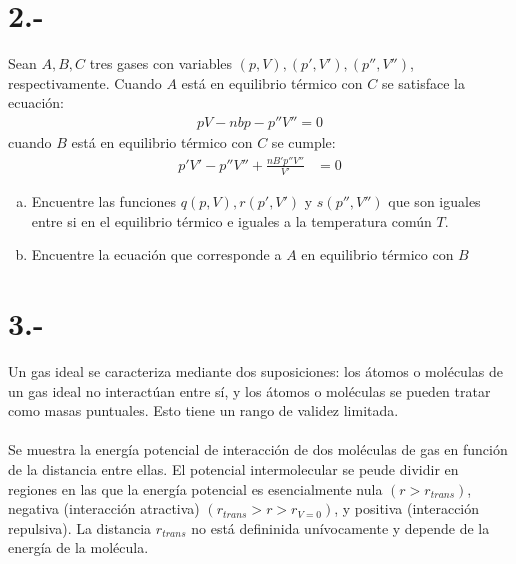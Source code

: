 \documentclass{article}
\begin{document}
\section*{2.-}
Sean $A,B,C$ tres gases con variables $(p,V),(p',V'),(p'',V'')$, respectivamente. 
Cuando $A$ está en equilibrio térmico con $C$ se satisface la ecuación:
\begin{align*}
    pV - nbp - p''V'' = 0
\end{align*}
cuando $B$ está en equilibrio térmico con $C$ se cumple:
\begin{align*}
    p'V' - p''V'' + \frac{nB'p''V''}{V'} &= 0
\end{align*}
\begin{enumerate}[a)]
    \item Encuentre las funciones $q(p,V),r(p',V')$ y $s(p'',V'')$ que son iguales 
    entre si en el equilibrio térmico e iguales a la temperatura común $T$.

    \item Encuentre la ecuación que corresponde a $A$ en equilibrio térmico con $B$
\end{enumerate}

\begin{tcolorbox}[breakable]
    
\end{tcolorbox}
\section*{3.-}
Un gas ideal se caracteriza mediante dos suposiciones: los átomos o moléculas de un gas 
ideal no interactúan entre sí, y los átomos o moléculas se pueden tratar como masas 
puntuales. Esto tiene un rango de validez limitada. \\ \\ 
Se muestra la energía potencial de interacción de dos moléculas de gas en función 
de la distancia entre ellas. El potencial intermolecular se peude dividir en regiones
en las que la energía potencial es esencialmente nula $(r>r_{trans})$, negativa
(interacción atractiva) $(r_{trans} > r > r_{V=0})$, y positiva (interacción repulsiva).
La distancia $r_{trans}$ no está defininida unívocamente y depende de la energía de la 
molécula.
\end{document}
